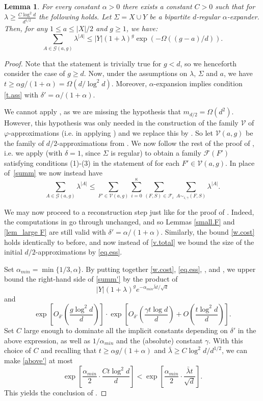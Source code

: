 \documentclass[10pt,a4paper]{amsart}
\newtheorem{lem}[thm]{Lemma}
\theoremstyle{definition}
\newcommand{\gl}{\lambda}
\newcommand{\cF}{\mathcal{F} }
\newcommand{\cG}{\mathcal{G} }
\newcommand{\cV}{\mathcal{V} }
\newcommand{\beq}[1]{\begin{equation}\label{#1}}
\newcommand{\enq}[0]{\end{equation}}
\newcommand{\0}[0]{\emptyset}
\newcommand{\lam}{\lambda}
\begin{document}
\begin{lem}\label{lem.algos}
    For every constant $\alpha>0$ there exists a constant $C>0$ such that for $\lam\geq \frac{C\log^2 d}{d^{1/2}}$ the following holds.
    Let $\Sigma=X\cup Y$ be a bipartite $d$-regular $\alpha$-expander. Then, for any $1\leq a\leq |X|/2$ and $g\geq 1$, we have:
    \[ \sum_{A\in \cG(a, g)} \lam^{|A|} \leq |Y|(1+\lam)^g \exp(-\Omega((g-a)/d)). \]
\end{lem}
\begin{proof}
Note that the statement is trivially true for $g<d$, so we henceforth consider the case of $g\geq d$. Now, under the assumptions on $\lam$, $\Sigma$ and $a$, we have $t\geq \alpha g/(1+\alpha) =\Omega(d/\log^2 d)$. Moreover, $\alpha$-expansion implies condition \eqref{t.ass} with $\delta'=\alpha/(1+\alpha)$.

We cannot apply , as we are missing the hypothesis that $m_{d/2}=\Omega(d^2)$. However, this hypothesis was only needed in the construction of the family $\cV$ of $\varphi$-approximations (i.e. in applying ) and we replace this by .  So let $\cV(a,g)$ be the family of $d/2$-approximations from .  We now follow the rest of the proof of , i.e. we apply  (with $\delta=1$, since $\Sigma$ is regular) to obtain a family $\cF(F')$ satisfying conditions (1)-(3) in the statement of  for each $F'\in\cV(a,g)$. In place of~\eqref{summ} we now instead have
\beq{summ'}\sum_{A \in \cG(a,g)} \gl^{|A|} \le \sum_{F' \in \cV(a,g)} \sum_{i=0}^\kappa \sum_{(F,S) \in \cF_i} \sum_{A \sim_{i, \gamma} (F,S)}\gl^{|A|}.\enq

We may now proceed to a reconstruction step just like for the proof of . Indeed, the computations in  go through unchanged, and so Lemmas \ref{small.F} and \ref{lem_large F} are still valid with $\delta'=\alpha/(1+\alpha)$. Similarly, the bound \eqref{w.cost} holds identically to before, and now instead of \eqref{v.total} we bound the size of the initial $d/2$-approximations by \eqref{eq.ess}.

Set $\alpha_{min}=\min\{1/3, \alpha\}$. By putting together \eqref{w.cost}, \eqref{eq.ess}, , and , we upper bound the right-hand side of \eqref{summ'} by the product of \[|Y|(1+\gl)^ge^{-\alpha_{min} \bar\gl t/\sqrt{d}}\] and
\beq{above'}\exp\left[O_{\delta'}\left(\frac{g\log^2 d}{d}\right)\right]\cdot \exp\left[O_{\delta'}\left(\frac{\gamma t\log d}{d}\right)+O\left(\frac{t\log^2 d}{d}\right)\right].\enq
Set $C$ large enough to dominate all the implicit constants depending on $\delta'$ in the above expression, as well as $1/\alpha_{min}$ and the (absolute) constant $\gamma$. With this choice of $C$ and recalling that $t\geq \alpha g/(1+\alpha)$ and $\bar\lam\geq C\log^2 d/d^{1/2}$, we can make \eqref{above'} at most
\[\exp\left[\frac{\alpha_{min}}{2}\cdot \frac{Ct\log^2 d}{d}\right]<\exp\left[\frac{\alpha_{min}}{2}\cdot\frac{\bar\gl t}{\sqrt{d}}\right].\]
This yields the conclusion of .
\end{proof}
\end{document}
